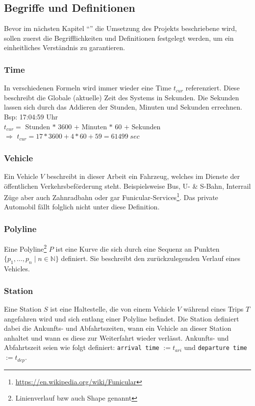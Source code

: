 \subsection{Begriffe und Definitionen}
\label{sub:begriffe}
  Bevor im nächsten Kapitel "`"' die Umsetzung des Projekts beschriebene wird, sollen zuerst die Begrifflichkeiten und Definitionen festgelegt werden, um ein einheitliches Verständnis zu garantieren.

  \subsubsection{Time}
  \label{ssub:time}
    In verschiedenen Formeln wird immer wieder eine Time $t_{cur}$ referenziert. Diese beschreibt die Globale (aktuelle) Zeit des Systems in Sekunden. 
    Die Sekunden lassen sich durch das Addieren der Stunden, Minuten und Sekunden errechnen.\\

    Bsp: 17:04:59 Uhr\\

    $t_{cur} = $ Stunden $*$ 3600 $+$ Minuten $*$ 60 $+$ Sekunden\\
    $\Rightarrow$ $t_{cur} = 17 * 3600 + 4 * 60 + 59 = 61499 \; sec$
    

  \subsubsection{Vehicle}
  \label{ssub:vehicle}
    Ein Vehicle $V$ beschreibt in dieser Arbeit ein Fahrzeug, welches im Dienste der öffentlichen Verkehrsbeförderung steht. Beispielsweise Bus, U- \& S-Bahn, Interrail Züge aber auch Zahnradbahn oder gar Funicular-Services\footnote{\url{https://en.wikipedia.org/wiki/Funicular}}. Das private Automobil fällt folglich nicht unter diese Definition.

  \subsubsection{Polyline}
  \label{ssub:polyline}
    Eine Polyline\footnote{Linienverlauf bzw auch Shape genannt} $P$ ist eine Kurve die sich durch eine Sequenz an Punkten $\{ p_1, \dotsc, p_n \;|\; n \in \mathbb{N} \}$ definiert. Sie beschreibt den zurückzulegenden Verlauf eines Vehicles.

  \subsubsection{Station}
  \label{ssub:station}
    Eine Station $S$ ist eine Haltestelle, die von einem Vehicle $V$ während eines Trips $T$ angefahren wird und sich entlang einer Polyline befindet. Die Station definiert dabei die Ankunfts- und Abfahrtszeiten, wann ein Vehicle an dieser Station anhaltet und wann es diese zur Weiterfahrt wieder verlässt. Ankunfts- und Abfahrtszeit seien wie folgt definiert: \texttt{arrival time} $ := t_{ari}$ und \texttt{departure time} $ := t_{dep}$.

